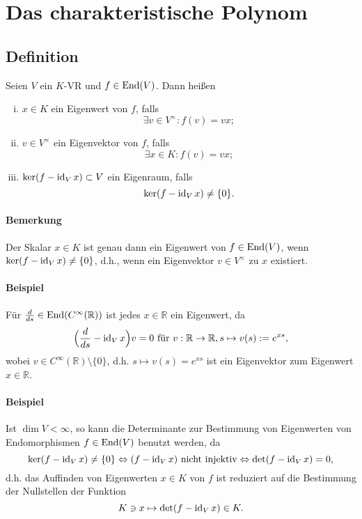 \section{Das charakteristische Polynom}
\subsection{Definition}
\begin{Definition}
	Seien $ V $ ein $ K $-VR und $ f\in\operatorname{End}(V) $. Dann heißen
		\begin{enumerate}[(i)]
			\item $ x\in K $ ein Eigenwert von $ f $, falls
				\[ \exists v\in V^\times: f(v)=vx; \]
			\item $ v\in V^\times $ ein Eigenvektor von $ f $, falls
				\[ \exists x\in K:f(v)=vx; \]
			\item $ \ker(f-\operatorname{id}_Vx) \subset V $ ein Eigenraum, falls
				\[ \ker(f-\operatorname{id}_Vx) \neq \{0\}.\]
		\end{enumerate}
	\end{Definition}
\paragraph{Bemerkung}
	Der Skalar $ x\in K $ ist genau dann ein Eigenwert von $ f\in \operatorname{End}(V) $, wenn $ \ker(f-\operatorname{id}_Vx)\neq \{0\} $, d.h., wenn ein Eigenvektor $ v\in V^\times $ zu $ x $ existiert.
\paragraph{Beispiel}
	Für $ \frac{d}{ds} \in \operatorname{End}(C^\infty(\mathbb{R}))$ ist jedes $ x\in \mathbb{R} $ ein Eigenwert, da
		\[ \Big(\frac{d}{ds}-\operatorname{id}_Vx\Big)v = 0 \text{ für } v:\mathbb{R}\to\mathbb{R},s\mapsto v(s):= e^{xs}, \]
	wobei $ v\in C^\infty(\mathbb{R})\setminus \{0\} $, d.h. $ s\mapsto v(s)=e^{xs} $ ist ein Eigenvektor zum Eigenwert $ x\in\mathbb{R} $.
\paragraph{Beispiel}
	Ist $ \dim V < \infty $, so kann die Determinante zur Bestimmung von Eigenwerten von Endomorphismen $ f\in\operatorname{End}(V) $ benutzt werden, da
		\[ \ker(f-\operatorname{id}_Vx)\neq \{0\} \Leftrightarrow (f-\operatorname{id}_Vx) \text{ nicht injektiv}\Leftrightarrow \det(f-\operatorname{id}_Vx) = 0, \]
	d.h. das Auffinden von Eigenwerten $ x\in K $ von $ f $ ist reduziert auf die Bestimmung der Nullstellen der Funktion
		\[ K\ni x\mapsto \det(f-\operatorname{id}_Vx)\in K. \]
		
